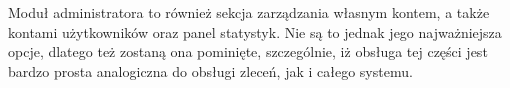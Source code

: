 \noindent Moduł administratora to również sekcja zarządzania własnym kontem, a także kontami użytkowników oraz panel statystyk. Nie są to jednak jego najważniejsza opcje, dlatego też zostaną ona pominięte, szczególnie, iż obsługa tej części jest bardzo prosta analogiczna do obsługi zleceń, jak i całego systemu.